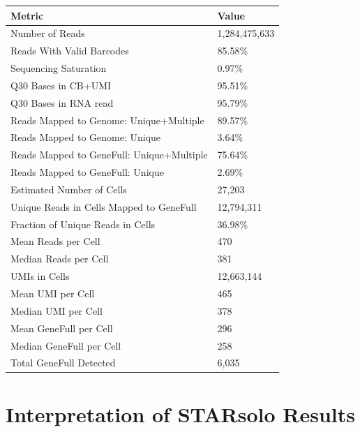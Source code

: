 \documentclass[
  11pt,
  a4paper,
]{report}
\begin{document}
\begin{table}

\caption{\label{tbl-starsolo-summary}STARsolo summary statistics}

\begin{minipage}{\linewidth}

\begin{longtable}[]{@{}ll@{}}
\toprule\noalign{}
Metric & Value \\
\midrule\noalign{}
\endhead
\bottomrule\noalign{}
\endlastfoot
Number of Reads & 1,284,475,633 \\
Reads With Valid Barcodes & 85.58\% \\
Sequencing Saturation & 0.97\% \\
Q30 Bases in CB+UMI & 95.51\% \\
Q30 Bases in RNA read & 95.79\% \\
Reads Mapped to Genome: Unique+Multiple & 89.57\% \\
Reads Mapped to Genome: Unique & 3.64\% \\
Reads Mapped to GeneFull: Unique+Multiple & 75.64\% \\
Reads Mapped to GeneFull: Unique & 2.69\% \\
Estimated Number of Cells & 27,203 \\
Unique Reads in Cells Mapped to GeneFull & 12,794,311 \\
Fraction of Unique Reads in Cells & 36.98\% \\
Mean Reads per Cell & 470 \\
Median Reads per Cell & 381 \\
UMIs in Cells & 12,663,144 \\
Mean UMI per Cell & 465 \\
Median UMI per Cell & 378 \\
Mean GeneFull per Cell & 296 \\
Median GeneFull per Cell & 258 \\
Total GeneFull Detected & 6,035 \\
\end{longtable}

\end{minipage}%

\end{table}%

\section{Interpretation of STARsolo
Results}\label{interpretation-of-starsolo-results}
\end{document}

